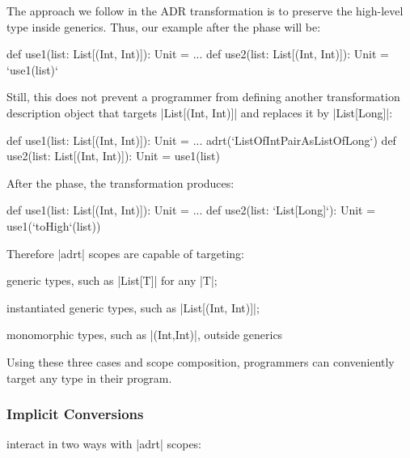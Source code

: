 The approach we follow in the ADR transformation is to preserve the high-level type inside generics. Thus, our example after the \commit{} phase will be:

\begin{lstlisting-nobreak}
def use1(list: List[(Int, Int)]): Unit = ...
def use2(list: List[(Int, Int)]): Unit = `use1(list)`
\end{lstlisting-nobreak}

Still, this does not prevent a programmer from defining another transformation description object that targets |List[(Int, Int)]| and replaces it by |List[Long]|:

\begin{lstlisting-nobreak}
def use1(list: List[(Int, Int)]): Unit = ...
adrt(`ListOfIntPairAsListOfLong`) {
  def use2(list: List[(Int, Int)]): Unit = use1(list)
}
\end{lstlisting-nobreak}

After the \commit{} phase, the transformation produces:

\begin{lstlisting-nobreak}
def use1(list: List[(Int, Int)]): Unit = ...
def use2(list: `List[Long]`): Unit = use1(`toHigh`(list))
\end{lstlisting-nobreak}

Therefore |adrt| scopes are capable of targeting:
\begin{compactitem}
\item generic types, such as |List[T]| for any |T|;
\item instantiated generic types, such as |List[(Int, Int)]|;
\item monomorphic types, such as |(Int,Int)|, outside generics
\end{compactitem}

\noindent
Using these three cases and scope composition, programmers can conveniently target any type in their program.

\subsubsection{Implicit Conversions}
\label{sec:ildl:language-implicit-conversions}
interact in two ways with |adrt| scopes:

